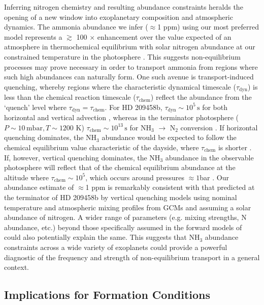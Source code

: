 \documentclass[fleqn,usenatbib]{mnras}
\begin{document}
Inferring nitrogen chemistry and resulting abundance constraints heralds the opening of a new window into exoplanetary composition and atmospheric dynamics. The ammonia abundance we infer ($\approx$1 ppm) using our most preferred model represents a $\gtrsim$ 100 $\times$ enhancement over the value expected of an atmosphere in thermochemical equilibrium with solar nitrogen abundance at our constrained temperature in the photosphere \citep{Moses2011}. This suggests non-equilibrium processes may prove necessary in order to transport ammonia from regions where such high abundances can naturally form. One such avenue is transport-induced quenching, whereby regions where the characteristic dynamical timescale ($\tau_{\mathrm{dyn}}$) is less than the chemical reaction timescale ($\tau_{\mathrm{chem}}$) reflect the abundance from the `quench' level where $\tau_{\mathrm{dyn}} = \tau_{\mathrm{chem}}$. For HD 209458b, $\tau_{\mathrm{dyn}} \sim 10^5 \, \mathrm{s}$ for both horizontal and vertical advection \citep{Cooper2006}, whereas in the terminator photosphere ($P \sim 10 \, \mathrm{mbar}, T \sim 1200$ K) $\tau_{\mathrm{chem}} \sim 10^{13} \, \mathrm{s}$ for NH$_3$ $\rightarrow$ N$_2$ conversion \citep{Zahnle2014}. If horizontal quenching dominates, the NH$_3$ abundance would be expected to follow the chemical equilibrium value characteristic of the dayside, where $ \tau_{\mathrm{chem}}$ is shorter \citep{Agundez2012}. If, however, vertical quenching dominates, the NH$_3$ abundance in the observable photosphere will reflect that of the chemical equilibrium abundance at the altitude where $\tau_{\mathrm{chem}} \sim 10^{5} $, which occurs around pressures $\approx 1$bar \citep{Moses2011}. Our abundance estimate of $\approx$1 ppm is remarkably consistent with that predicted at the terminator of HD 209458b by vertical quenching models \citep{Moses2011} using nominal temperature and atmospheric mixing profiles from GCMs \citep{Showman2009} and assuming a solar abundance of nitrogen. A wider range of parameters (e.g. mixing strengths, N abundance, etc.) beyond those specifically assumed in the forward models of \citet{Moses2011} could also potentially explain the same. This suggests that NH$_3$ abundance constraints across a wide variety of exoplanets could provide a powerful diagnostic of the frequency and strength of non-equilibrium transport in a general context.

\subsection{Implications for Formation Conditions}
\end{document}
